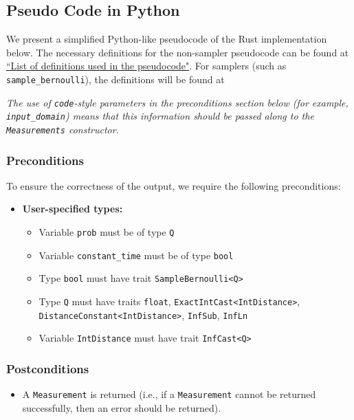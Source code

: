 \documentclass[11pt,a4paper]{article}
\newcommand{\vicki}[1]{{ {\color{olive}{(vicki)~#1}}}}
\theoremstyle{definition}
\begin{document}
\subsection{Pseudo Code in Python}
We present a simplified Python-like pseudocode of the Rust implementation below. The necessary definitions for the non-sampler pseudocode can be found at \href{https://github.com/opendp/whitepapers/blob/pseudocode-defns/pseudocode-defns/pseudocode_defns.pdf}{``List of definitions used in the pseudocode"}. \vicki{fix link} For samplers (such as \texttt{sample\_bernoulli}), the definitions will be found at \vicki{insert link here}

\emph{The use of \texttt{code}-style parameters in the preconditions section below (for example, \texttt{input\_domain}) means that this information should be passed along to the \texttt{Measurements} constructor.}

\subsubsection*{Preconditions}
To ensure the correctness of the output, we require the following preconditions:

\begin{itemize}
    \item \textbf{User-specified types:}
    \begin{itemize}
        \item Variable \texttt{prob} must be of type \texttt{Q}
        \item Variable \texttt{constant\_time} must be of type \texttt{bool}
        \item Type \texttt{bool} must have trait \texttt{SampleBernoulli<Q>}
        \item Type \texttt{Q} must have traits \texttt{float}, \texttt{ExactIntCast<IntDistance>},\\ \texttt{DistanceConstant<IntDistance>}, \texttt{InfSub}, \texttt{InfLn}
        \item Variable \texttt{IntDistance} must have trait \texttt{InfCast<Q>}
    \end{itemize}
\end{itemize}

\subsubsection*{Postconditions}
\begin{itemize}
    \item A \texttt{Measurement} is returned (i.e., if a \texttt{Measurement} cannot be returned successfully, then an error should be returned).
\end{itemize}
\end{document}
